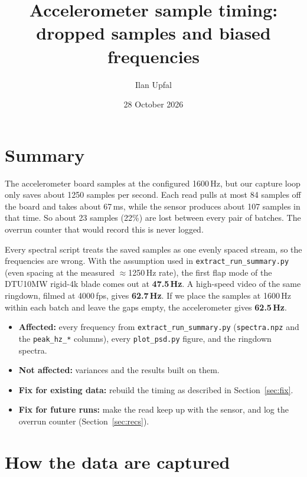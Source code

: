 \documentclass[11pt]{article}
\title{Accelerometer sample timing: dropped samples and biased frequencies}
\author{Ilan Upfal}
\date{28 October 2026}
\newcommand{\code}[1]{\texttt{#1}}
\begin{document}
\maketitle

\section*{Summary}

The accelerometer board samples at the configured 1600\,Hz, but our capture
loop only saves about 1250 samples per second. Each read pulls at most 84
samples off the board and takes about 67\,ms, while the sensor produces
about 107 samples in that time. So about 23 samples (22\%) are lost between
every pair of batches. The overrun counter that would record this is never
logged.

Every spectral script treats the saved samples as one evenly spaced stream,
so the frequencies are wrong. With the assumption used in
\code{extract\_run\_summary.py} (even spacing at the measured $\approx$1250\,Hz
rate), the first flap mode of the DTU10MW rigid-4k blade comes out at
\textbf{47.5\,Hz}. A high-speed video of the same ringdown, filmed at
4000\,fps, gives \textbf{62.7\,Hz}. If we place the samples at 1600\,Hz
within each batch and leave the gaps empty, the accelerometer gives
\textbf{62.5\,Hz}.

\begin{itemize}
  \item \textbf{Affected:} every frequency from \code{extract\_run\_summary.py}
        (\code{spectra.npz} and the \code{peak\_hz\_*} columns), every
        \code{plot\_psd.py} figure, and the ringdown spectra.
  \item \textbf{Not affected:} variances and the results built on them.
  \item \textbf{Fix for existing data:} rebuild the timing as described in
        Section~\ref{sec:fix}.
  \item \textbf{Fix for future runs:} make the read keep up with the sensor,
        and log the overrun counter (Section~\ref{sec:recs}).
\end{itemize}

\section{How the data are captured}
\end{document}
